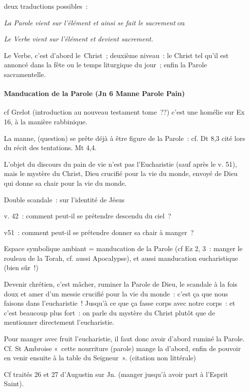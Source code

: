 deux traductions possibles~:

 
\emph{La Parole vient sur l'élément et ainsi se fait le sacrement} ou

\emph{Le Verbe vient sur l'élément et devient sacrement.}
 

Le Verbe, c'est d'abord le~Christ~; deuxième niveau~: le Christ tel
qu'il est annoncé dans la fête ou le temps liturgique du jour~; enfin la
Parole sacramentelle.

\hypertarget{b-manducation-de-la-parole-jn-6-manne-parole-pain}{%
\paragraph{Manducation de la Parole (Jn 6 Manne Parole
Pain)}\label{b-manducation-de-la-parole-jn-6-manne-parole-pain}}

cf Grelot (introduction au nouveau testament tome~??) c'est une homélie
sur Ex 16, à la manière rabbinique.

La manne, (question) se prête déjà à être figure de la Parole~: cf. Dt
8,3 cité lors du récit des tentations. Mt 4,4.

L'objet du discours du pain de vie n'est pas l'Eucharistie (sauf après
le v. 51), mais le mystère du Christ, Dieu crucifié pour la vie du
monde, envoyé de Dieu qui donne sa chair pour la vie du monde.

Double scandale~: sur l'identité de Jésus

v. 42~: comment peut-il se prétendre descendu du ciel~?

v51~: comment peut-il se prétendre donner sa chair à manger~?

Espace symbolique ambiant = manducation de la Parole (cf Ez 2, 3~:
manger le rouleau de la Torah, cf. aussi Apocalypse), et aussi
manducation eucharistique (bien sûr~!)

Devenir chrétien, c'est mâcher, ruminer la Parole de Dieu, le scandale à
la fois doux et amer d'un messie crucifié pour la vie du monde~: c'est
ça que nous faisons dans l'eucharistie~! Jusqu'à ce que ça fasse corps
avec notre corps~: et c'est beaucoup plus fort~: on parle du mystère du
Christ plutôt que de mentionner directement l'eucharistie.

Pour manger avec fruit l'eucharistie, il faut donc avoir d'abord ruminé
la Parole. Cf. St Ambroise «~cette nourriture (parole) mange la d'abord,
enfin de pouvoir en venir ensuite à la table du Seigneur~». (citation
non littérale)

Cf traités 26 et 27 d'Augustin sur Jn. (manger jusqu'à avoir part à
l'Esprit Saint).

